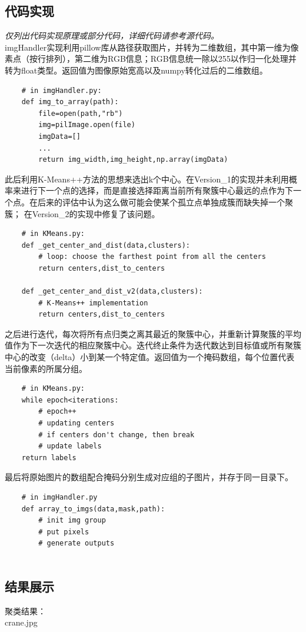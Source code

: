 \documentclass{article}
\begin{document}
\subsection{代码实现}
\textit{仅列出代码实现原理或部分代码，详细代码请参考源代码。}\\
\lstset{
    language=python,
    frame=shadowbox,
    breaklines=true
}
imgHandler实现利用pillow库从路径获取图片，并转为二维数组，其中第一维为像素点（按行排列），第二维为RGB信息；RGB信息统一除以255以作归一化处理并转为float类型。返回值为图像原始宽高以及numpy转化过后的二维数组。
\begin{lstlisting}
    # in imgHandler.py:
    def img_to_array(path):
        file=open(path,"rb")
        img=pilImage.open(file)
        imgData=[]
        ...
        return img_width,img_height,np.array(imgData)
\end{lstlisting}
此后利用K-Means++方法的思想来选出k个中心。在Version\_1的实现并未利用概率来进行下一个点的选择，而是直接选择距离当前所有聚簇中心最远的点作为下一个点。在后来的评估中认为这么做可能会使某个孤立点单独成簇而缺失掉一个聚簇；
在Version\_2的实现中修复了该问题。
\begin{lstlisting}
    # in KMeans.py:
    def _get_center_and_dist(data,clusters):
        # loop: choose the farthest point from all the centers
        return centers,dist_to_centers

    def _get_center_and_dist_v2(data,clusters):
        # K-Means++ implementation
        return centers,dist_to_centers
\end{lstlisting}
之后进行迭代，每次将所有点归类之离其最近的聚簇中心，并重新计算聚簇的平均值作为下一次迭代的相应聚簇中心。迭代终止条件为迭代数达到目标值或所有聚簇中心的改变（delta）小到某一个特定值。返回值为一个掩码数组，每个位置代表当前像素的所属分组。
\begin{lstlisting}
    # in KMeans.py:
    while epoch<iterations:
        # epoch++
        # updating centers
        # if centers don't change, then break
        # update labels
    return labels
\end{lstlisting}
最后将原始图片的数组配合掩码分别生成对应组的子图片，并存于同一目录下。
\begin{lstlisting}
    # in imgHandler.py
    def array_to_imgs(data,mask,path):
        # init img group
        # put pixels
        # generate outputs
    
\end{lstlisting}

\subsection{结果展示}
聚类结果：\\
crane.jpg
\end{document}
